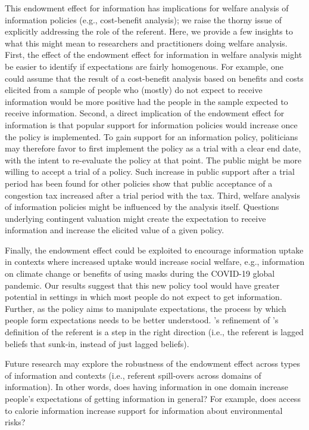 This endowment effect for information has implications for welfare analysis of information policies (e.g., cost-benefit analysis); we raise the thorny issue of explicitly addressing the role of the referent.  Here, we provide a few insights to what this might mean to researchers and practitioners doing welfare analysis. First, the effect of the endowment effect for information in welfare analysis might be easier to identify if expectations are fairly homogenous. For example, one could assume that the result of a cost-benefit analysis based on benefits and costs elicited from a sample of people who (mostly) do not expect to receive information would be more positive had the people in the sample expected to receive information.  Second, a direct implication of the endowment effect for information is that popular support for information policies would increase once the policy is implemented. To gain support for an information policy, politicians may therefore favor to first implement the policy as a trial with a clear end date, with the intent to re-evaluate the policy at that point. The public might be more willing to accept a trial of a policy. Such increase in public support after a trial period has been found for other policies\textemdash \citet{cherryImpactTrialRuns2014} show that public acceptance of a congestion tax increased after a trial period with the tax. Third, welfare analysis of information policies might be influenced by the analysis itself. Questions underlying contingent valuation might create the expectation to receive information and increase the elicited value of a given policy.

Finally, the endowment effect could be exploited to encourage information uptake in contexts where increased uptake would increase social welfare, e.g., information on climate change or benefits of using masks during the COVID-19 global pandemic. Our results suggest that this new policy tool would have greater potential in settings in which most people do not expect to get information.  Further, as the policy aims to manipulate expectations, the process by which people form expectations needs to be better understood. \citet{heffetzAreReferencePoints2018}’s refinement of \citet{koszegiModelReferenceDependentPreferences2006}’s definition of the referent is a step in the right direction (i.e., the referent is lagged beliefs that sunk-in, instead of just lagged beliefs).

Future research may explore the robustness of the endowment effect across types of information and contexts (i.e., referent spill-overs across domains of information). In other words, does having information in one domain increase people’s expectations of getting information in general? For example, does access to calorie information increase support for information about environmental risks?

